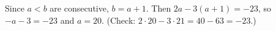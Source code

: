 Since $a<b$ are consecutive, $b=a+1$. Then $2a-3(a+1)=-23$, so $-a-3=-23$ and $a=\boxed{20}$. (Check: $2\cdot20-3\cdot21=40-63=-23$.)

